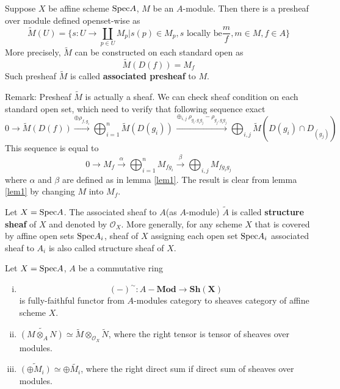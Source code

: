 \begin{mydefn}
Suppose $X$ be affine scheme $\text{Spec} A$, $M$ be an $A$-module. Then there is a presheaf over module defined openset-wise as
\[
\widetilde{M}(U)=\{s: U \rightarrow \coprod_{p \in U} M_{p} | s(p) \in M_{p}, s \text{ locally be} \frac{m}{f}, m \in M, f \in A \}
\]
More precisely, $\widetilde{M}$ can be constructed on each standard open as
\[
\widetilde{M}(D(f))=M_{f}
\]
Such presheaf $\widetilde{M}$ is called \textbf{associated presheaf} to $M$.
\end{mydefn}
Remark: Presheaf $\widetilde{M}$ is actually a sheaf. We can check sheaf condition on each standard  open set, which need to verify that following sequence exact
\[
0 \rightarrow \widetilde{M}(D(f)) \xrightarrow{\oplus \rho_{f,g_i}} \bigoplus_{i=1}^{n} \widetilde{M}(D(g_i)) \xrightarrow{\oplus_{i,j} \rho_{g_i,g_{i}g_{j}}-\rho_{g_{j},g_{i}g_{j}}} \bigoplus_{i,j}\widetilde{M}(D(g_i) \cap D_(g_j))
\]
This sequence is equal to
\[
0 \rightarrow M_f \xrightarrow{\alpha} \bigoplus_{i=1}^{n} M_{fg_i} \xrightarrow{\beta} \bigoplus_{i,j}M_{fg_{i}g_{j}}
\]
where $\alpha$ and $\beta$ are defined as in lemma \ref{lem1}. The result is clear from lemma \ref{lem1} by changing $M$ into $M_f$.

\begin{mydefn}
Let $X=\text{Spec} A$. The associated sheaf to $A$(as $A$-module) $\widetilde{A}$ is called \textbf{structure sheaf} of $X$ and denoted by $\mathcal{O}_{X}$. More generally, for any scheme $X$ that is covered by affine open sets $\text{Spec} A_{i}$, sheaf of $X$ assigning each open set $\text{Spec} A_{i}$ associated sheaf to $A_i$ is also called structure sheaf of $X$.
\end{mydefn}

\begin{prop}
Let $X=\text{Spec} A$, $A$ be a commutative ring
\begin{enumerate}[(i)]
	\item
	\[
	(-)^{\sim}: A-\mathbf{Mod} \rightarrow \mathbf{Sh(X)}
	\]
	is fully-faithful functor from $A$-modules category to sheaves category of affine scheme $X$.
	\item $\widetilde{(M\otimes_{A}N)} \simeq \widetilde{M} \otimes_{\mathcal{O}_{X}} \widetilde{N}$, where the right tensor is tensor of sheaves over modules.
	\item $\widetilde{(\oplus M_{i})} \simeq \oplus \widetilde{M_{i}}$, where the right direct sum if direct sum of sheaves over modules.
\end{enumerate}
\end{prop}

